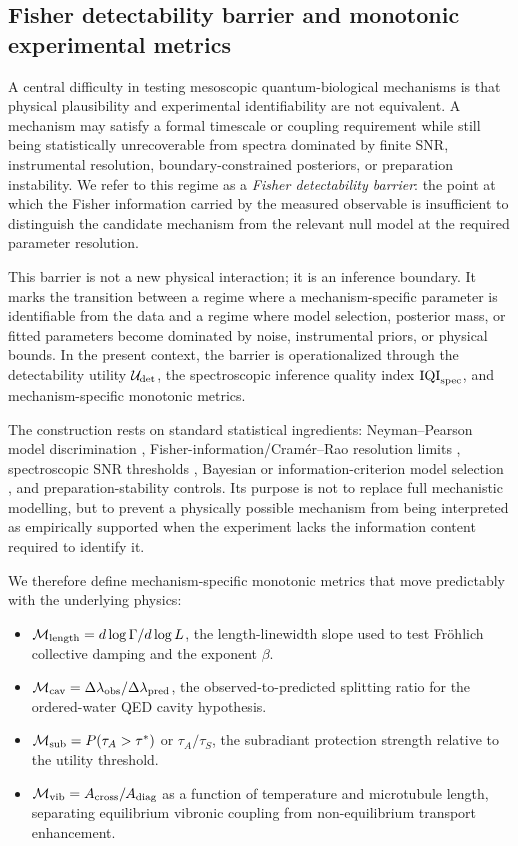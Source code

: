 \documentclass[twocolumn,10pt]{article}
\begin{document}
\subsection{Fisher detectability barrier and monotonic experimental metrics}
\label{sec:fisher_barrier_metrics}

A central difficulty in testing mesoscopic quantum-biological mechanisms is
that physical plausibility and experimental identifiability are not equivalent.
A mechanism may satisfy a formal timescale or coupling requirement while still
being statistically unrecoverable from spectra dominated by finite SNR,
instrumental resolution, boundary-constrained posteriors, or preparation
instability. We refer to this regime as a \emph{Fisher detectability barrier}:
the point at which the Fisher information carried by the measured observable
is insufficient to distinguish the candidate mechanism from the relevant null
model at the required parameter resolution.

This barrier is not a new physical interaction; it is an inference boundary.
It marks the transition between a regime where a mechanism-specific parameter
is identifiable from the data and a regime where model selection, posterior
mass, or fitted parameters become dominated by noise, instrumental priors, or
physical bounds. In the present context, the barrier is operationalized through
the detectability utility \(\mathcal{U}_{\rm det}\), the spectroscopic inference
quality index \({\rm IQI}_{\rm spec}\), and mechanism-specific monotonic
metrics.

The construction rests on standard statistical ingredients: Neyman--Pearson
model discrimination \cite{NeymanPearson1933}, Fisher-information/Cramér--Rao resolution limits \cite{Cramer1946,Rao1945},
spectroscopic SNR thresholds \cite{Kay1993}, Bayesian or information-criterion model
selection \cite{Schwarz1978}, and preparation-stability controls. Its purpose is not to replace
full mechanistic modelling, but to prevent a physically possible mechanism
from being interpreted as empirically supported when the experiment lacks the
information content required to identify it.

We therefore define mechanism-specific monotonic metrics that move predictably
with the underlying physics:

\begin{itemize}
\item \(\mathcal{M}_{\rm length}=d\log\Gamma/d\log L\), the length-linewidth
slope used to test Fr\"ohlich collective damping and the exponent \(\beta\).
\item \(\mathcal{M}_{\rm cav}=\Delta\lambda_{\rm obs}/\Delta\lambda_{\rm pred}\),
the observed-to-predicted splitting ratio for the ordered-water QED cavity
hypothesis.
\item \(\mathcal{M}_{\rm sub}=P(\tau_A>\tau^*)\) or \(\tau_A/\tau_S\), the
subradiant protection strength relative to the utility threshold.
\item \(\mathcal{M}_{\rm vib}=A_{\rm cross}/A_{\rm diag}\) as a function of
temperature and microtubule length, separating equilibrium vibronic coupling
from non-equilibrium transport enhancement.
\end{itemize}
\end{document}
